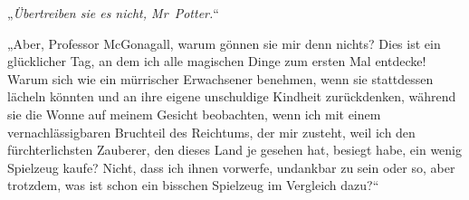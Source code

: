 „\emph{Übertreiben sie es nicht, Mr~Potter.}“

„Aber, Professor McGonagall, warum gönnen sie mir denn nichts? Dies ist ein glücklicher Tag, an dem ich alle magischen Dinge zum ersten Mal entdecke! Warum sich wie ein mürrischer Erwachsener benehmen, wenn sie stattdessen lächeln könnten und an ihre eigene unschuldige Kindheit zurückdenken, während sie die Wonne auf meinem Gesicht beobachten, wenn ich mit einem vernachlässigbaren Bruchteil des Reichtums, der mir zusteht, weil ich den fürchterlichsten Zauberer, den dieses Land je gesehen hat, besiegt habe, ein wenig Spielzeug kaufe? Nicht, dass ich ihnen vorwerfe, undankbar zu sein oder so, aber trotzdem, was ist schon ein bisschen Spielzeug im Vergleich dazu?“

